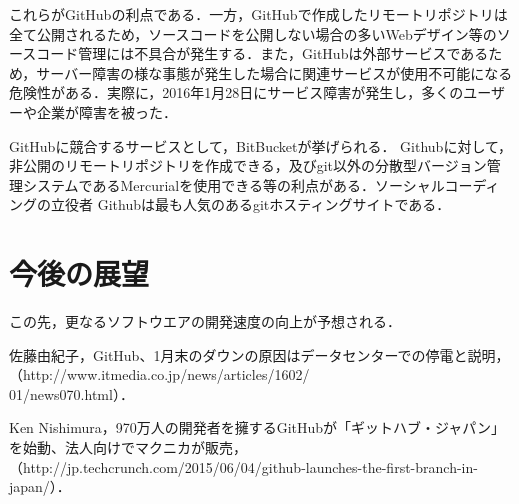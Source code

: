 \documentclass[a4paper,9pt,twocolumn]{jsarticle}
\begin{document}
これらがGitHubの利点である．一方，GitHubで作成したリモートリポジトリは全て公開されるため，ソースコードを公開しない場合の多いWebデザイン等のソースコード管理には不具合が発生する．また，GitHubは外部サービスであるため，サーバー障害の様な事態が発生した場合に関連サービスが使用不可能になる危険性がある．実際に，2016年1月28日にサービス障害が発生し，多くのユーザーや企業が障害を被った．\cite{news}

GitHubに競合するサービスとして，BitBucketが挙げられる． Githubに対して，非公開のリモートリポジトリを作成できる，及びgit以外の分散型バージョン管理システムであるMercurialを使用できる等の利点がある．ソーシャルコーディングの立役者
Githubは最も人気のあるgitホスティングサイトである．\cite{github}

\section{今後の展望}
この先，更なるソフトウエアの開発速度の向上が予想される．

\small
\begin{thebibliography}{99}
佐藤由紀子，GitHub、1月末のダウンの原因はデータセンターでの停電と説明，（http://www.itmedia.co.jp/news/articles/1602/\\01/news070.html）．

Ken Nishimura，970万人の開発者を擁するGitHubが「ギットハブ・ジャパン」を始動、法人向けでマクニカが販売，（http://jp.techcrunch.com/2015/06/04/github-launches-the-first-branch-in-japan/）．
\end{thebibliography}
\end{document}
